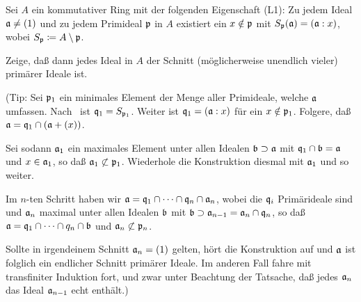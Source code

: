 \begin{exercise}
	\label{exer:prop_l1}
	Sei \(A\) ein kommutativer Ring mit der folgenden Eigenschaft (L1):
	Zu jedem Ideal \(\mathfrak{a} \neq (1)\) und zu jedem Primideal \(\mathfrak{p}\)
	in \(A\) existiert ein \(x \notin \mathfrak{p}\) mit \(S_{\mathfrak{p}}(\mathfrak{a})
	= (\mathfrak{a} : x)\), wobei \(S_{\mathfrak{p}} \coloneqq A \setminus \mathfrak{p}\).
	
	Zeige, daß dann jedes Ideal in \(A\) der Schnitt (möglicherweise unendlich
	vieler) primärer Ideale ist.
	
	(Tip: Sei \(\mathfrak{p}_1\) ein minimales Element der Menge aller Primideale,
	welche \(\mathfrak{a}\) umfassen. Nach~
	ist \(\mathfrak{q}_1 = S_{\mathfrak{p}_1}\). Weiter ist \(\mathfrak{q}_1 = (\mathfrak{a} :
	x)\) für ein \(x \notin \mathfrak{p}_1\). Folgere, daß \(\mathfrak{a} = \mathfrak{q}_1
	\cap (\mathfrak{a} + (x))\).
	
	Sei sodann \(\mathfrak{a}_1\) ein maximales Element unter allen Idealen
	\(\mathfrak{b} \supset \mathfrak{a}\) mit \(\mathfrak{q}_1 \cap \mathfrak{b} = \mathfrak{a}\)
	und \(x \in \mathfrak{a}_1\), so daß \(\mathfrak{a}_1 \not\subset \mathfrak{p}_1\).
	Wiederhole die Konstruktion diesmal mit \(\mathfrak{a}_1\) und so weiter.
	
	Im \(n\)-ten Schritt haben wir \(\mathfrak{a} = \mathfrak{q}_1 \cap \dotsb \cap
	\mathfrak{q}_n \cap \mathfrak{a}_n\), wobei die \(\mathfrak{q}_i\) Primärideale sind
	und \(\mathfrak{a}_n\) maximal unter allen Idealen \(\mathfrak{b}\) mit
	\(\mathfrak{b} \supset \mathfrak{a}_{n - 1} = \mathfrak{a}_n \cap \mathfrak{q}_n\), so
	daß \(\mathfrak{a} = \mathfrak{q}_1 \cap \dotsb \cap q_n \cap \mathfrak{b}\) und
	\(\mathfrak{a}_n \not\subset \mathfrak{p}_n\).
	
	Sollte in irgendeinem Schnitt \(\mathfrak{a}_n = (1)\) gelten, hört die
	Konstruktion auf und \(\mathfrak{a}\) ist folglich ein endlicher Schnitt
	primärer Ideale. Im anderen Fall fahre mit transfiniter Induktion fort, und
	zwar unter Beachtung der Tatsache, daß jedes \(\mathfrak{a}_n\) das Ideal
	\(\mathfrak{a}_{n - 1}\) echt enthält.)
\end{exercise}

